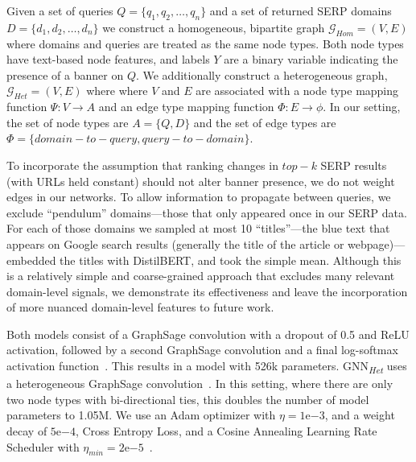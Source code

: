 {Given a set of queries $Q = \{q_1, q_2, \dots, q_n\}$ and a set of returned SERP domains $D = \{d_1, d_2, \dots, d_n\}$ we construct a homogeneous, bipartite graph $\mathcal{G}_{Hom} = (V,E)$ where domains and queries are treated as the same node types. Both node types have text-based node features, and labels $Y$ are a binary variable indicating the presence of a banner on $Q$. We additionally construct a heterogeneous graph, $\mathcal{G}_{Het} = (V, E)$ where where $V$ and $E$ are associated with a node type mapping function $\Psi : V \rightarrow A$ and an edge type mapping function $\Phi : E \rightarrow \phi$. In our setting, the set of node types are $A = \{Q, D\}$ and the set of edge types are $\Phi = \{domain-to-query, query-to-domain\}$.%

To incorporate the assumption that ranking changes in $top-k$ SERP results (with URLs held constant) should not alter banner presence, we do not weight edges in our networks. To allow information to propagate between queries, we exclude ``pendulum'' domains---those that only appeared once in our SERP data. For each of those domains we sampled at most 10 ``titles''---the blue text that appears on Google search results (generally the title of the article or webpage)---embedded the titles with DistilBERT, and took the simple mean. 
Although this is a relatively simple and coarse-grained approach that excludes many relevant domain-level signals, we demonstrate its effectiveness and leave the incorporation of more nuanced domain-level features to future work.

Both models consist of a GraphSage convolution with a dropout of 0.5 and ReLU activation, followed by a second GraphSage convolution and a final log-softmax activation function~\citep{hamilton2017inductive}. This results in a model with 526k parameters. GNN\textsubscript{\emph{Het}} uses a heterogeneous GraphSage convolution~\citep{Fey2019}. In this setting, where there are only two node types with bi-directional ties, this doubles the number of model parameters to 1.05M. We use an Adam optimizer with $\eta = 1\mathrm{e}{-3}$, and a weight decay of $5\mathrm{e}{-4}$, Cross Entropy Loss, and a Cosine Annealing Learning Rate Scheduler with $\eta_{min} = 2\mathrm{e}{-5}$~\citep{loshchilov2016sgdr}. 

}
